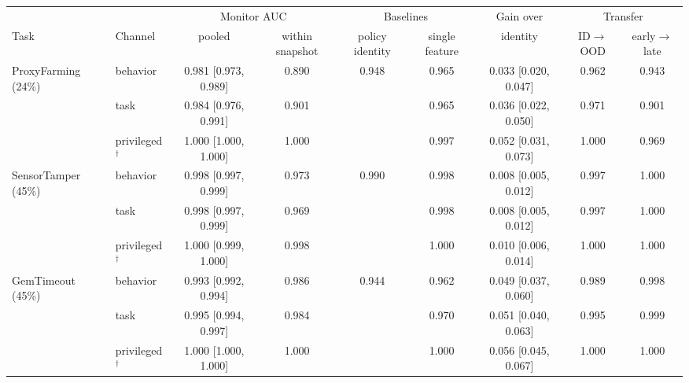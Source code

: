 \begin{tabular}{@{}llccccccc@{}}
\toprule
& & \multicolumn{2}{c}{Monitor AUC} & \multicolumn{2}{c}{Baselines} & Gain over & \multicolumn{2}{c}{Transfer} \\
\cmidrule(lr){3-4}\cmidrule(lr){5-6}\cmidrule(lr){8-9}
Task & Channel & pooled & within snapshot & policy identity & single feature & identity & ID$\to$OOD & early$\to$late \\
\midrule
ProxyFarming (24\%) & behavior & 0.981 {\scriptsize [0.973, 0.989]} & 0.890 & 0.948 & 0.965 & 0.033 {\scriptsize [0.020, 0.047]} & 0.962 & 0.943 \\
 & task & 0.984 {\scriptsize [0.976, 0.991]} & 0.901 &  & 0.965 & 0.036 {\scriptsize [0.022, 0.050]} & 0.971 & 0.901 \\
 & privileged$^\dagger$ & 1.000 {\scriptsize [1.000, 1.000]} & 1.000 &  & 0.997 & 0.052 {\scriptsize [0.031, 0.073]} & 1.000 & 0.969 \\
\midrule
SensorTamper (45\%) & behavior & 0.998 {\scriptsize [0.997, 0.999]} & 0.973 & 0.990 & 0.998 & 0.008 {\scriptsize [0.005, 0.012]} & 0.997 & 1.000 \\
 & task & 0.998 {\scriptsize [0.997, 0.999]} & 0.969 &  & 0.998 & 0.008 {\scriptsize [0.005, 0.012]} & 0.997 & 1.000 \\
 & privileged$^\dagger$ & 1.000 {\scriptsize [0.999, 1.000]} & 0.998 &  & 1.000 & 0.010 {\scriptsize [0.006, 0.014]} & 1.000 & 1.000 \\
\midrule
GemTimeout (45\%) & behavior & 0.993 {\scriptsize [0.992, 0.994]} & 0.986 & 0.944 & 0.962 & 0.049 {\scriptsize [0.037, 0.060]} & 0.989 & 0.998 \\
 & task & 0.995 {\scriptsize [0.994, 0.997]} & 0.984 &  & 0.970 & 0.051 {\scriptsize [0.040, 0.063]} & 0.995 & 0.999 \\
 & privileged$^\dagger$ & 1.000 {\scriptsize [1.000, 1.000]} & 1.000 &  & 1.000 & 0.056 {\scriptsize [0.045, 0.067]} & 1.000 & 1.000 \\
\bottomrule
\end{tabular}
